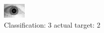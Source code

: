 \begin{figure}[h!]
\begin{center}
\includegraphics[width=0.60\columnwidth]{figures/ID1657_class_3_target_2.png}
\end{center}
\caption{ Classification: 3 actual target: 2}
\label{fig:ID1657_class_3_target_2}
\end{figure}
